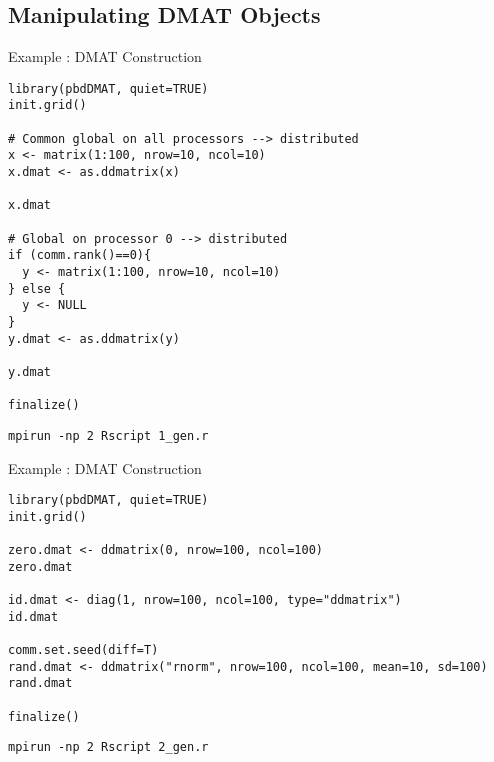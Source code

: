 
\subsection{Manipulating DMAT Objects}

\begin{frame}
  \begin{exampleblock}{Example \countex:  DMAT Construction}\pause
\begin{lstlisting}[title=Generate a global matrix and distribute it]
library(pbdDMAT, quiet=TRUE)
init.grid()

# Common global on all processors --> distributed
x <- matrix(1:100, nrow=10, ncol=10)
x.dmat <- as.ddmatrix(x)

x.dmat

# Global on processor 0 --> distributed
if (comm.rank()==0){
  y <- matrix(1:100, nrow=10, ncol=10)
} else {
  y <- NULL
}
y.dmat <- as.ddmatrix(y)

y.dmat

finalize()
\end{lstlisting}
\begin{lstlisting}[basicstyle=\tiny,backgroundcolor=\color{white},keywordstyle=\color{black},
title=\fontsize{6pt}{7.2}\selectfont Execute this script via:]
mpirun -np 2 Rscript 1_gen.r
\end{lstlisting} 
  \end{exampleblock}
\end{frame}



\begin{frame}[fragile]
  \begin{exampleblock}{Example \countex:  DMAT Construction}\pause
\begin{lstlisting}[title=Generate locally only what is needed]
library(pbdDMAT, quiet=TRUE)
init.grid()

zero.dmat <- ddmatrix(0, nrow=100, ncol=100)
zero.dmat

id.dmat <- diag(1, nrow=100, ncol=100, type="ddmatrix")
id.dmat

comm.set.seed(diff=T)
rand.dmat <- ddmatrix("rnorm", nrow=100, ncol=100, mean=10, sd=100)
rand.dmat

finalize()
\end{lstlisting}
\begin{lstlisting}[basicstyle=\tiny,backgroundcolor=\color{white},keywordstyle=\color{black},
title=\fontsize{6pt}{7.2}\selectfont Execute this script via:]
mpirun -np 2 Rscript 2_gen.r
\end{lstlisting} 
  \end{exampleblock}
\end{frame}


